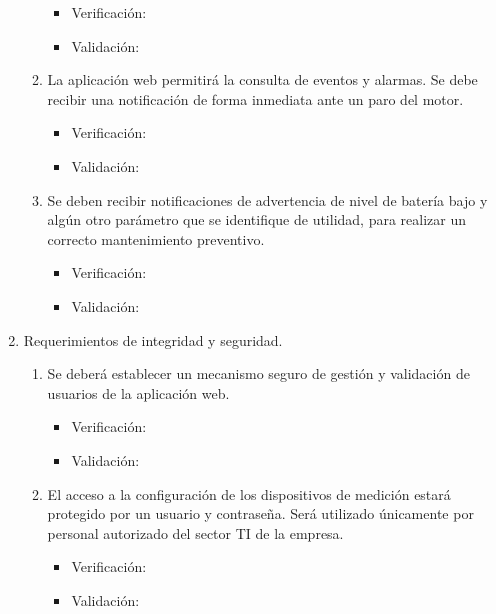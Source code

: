\documentclass[
11pt, %
]{charter}
\begin{document}
\begin{enumerate}
\begin{enumerate}
			\begin{itemize}
				\item Verificación:
				\item Validación: 
			\end{itemize}
			\item La aplicación web permitirá la consulta de eventos y alarmas. Se debe recibir una notificación de forma inmediata ante un paro del motor.
			\begin{itemize}
				\item Verificación:
				\item Validación: 
			\end{itemize}
			\item Se deben recibir notificaciones de advertencia de nivel de batería bajo y algún otro parámetro que se identifique de utilidad, para realizar un correcto mantenimiento preventivo.
			\begin{itemize}
				\item Verificación:
				\item Validación: 
			\end{itemize}
		\end{enumerate}

	\item Requerimientos de integridad y seguridad.
		\begin{enumerate}
			\item Se deberá establecer un mecanismo seguro de gestión y validación de usuarios de la aplicación web.
			\begin{itemize}
				\item Verificación:
				\item Validación: 
			\end{itemize}
			\item El acceso a la configuración de los dispositivos de medición estará protegido por un usuario y contraseña. Será utilizado únicamente por personal autorizado del sector TI de la empresa.
			\begin{itemize}
				\item Verificación:
				\item Validación: 
			\end{itemize}
		\end{enumerate}
	

\end{enumerate}
\end{document}
